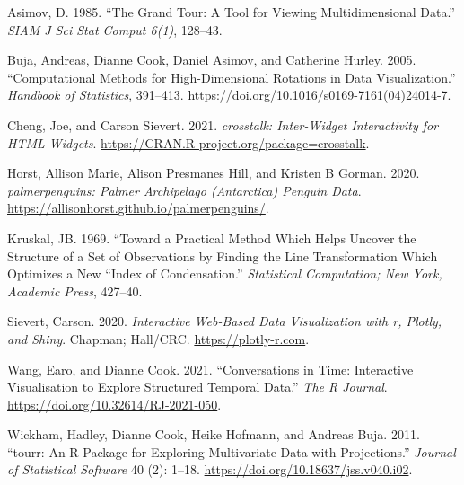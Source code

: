 \hypertarget{refs}{}
\begin{CSLReferences}{1}{0}
\leavevmode{}%
Asimov, D. 1985. {``The Grand Tour: A Tool for Viewing Multidimensional Data.''} \emph{SIAM J Sci Stat Comput 6(1)}, 128--43.

\leavevmode{}%
Buja, Andreas, Dianne Cook, Daniel Asimov, and Catherine Hurley. 2005. {``Computational Methods for High-Dimensional Rotations in Data Visualization.''} \emph{Handbook of Statistics}, 391--413. \url{https://doi.org/10.1016/s0169-7161(04)24014-7}.

\leavevmode{}%
Cheng, Joe, and Carson Sievert. 2021. \emph{{crosstalk}: Inter-Widget Interactivity for HTML Widgets}. \url{https://CRAN.R-project.org/package=crosstalk}.

\leavevmode{}%
Horst, Allison Marie, Alison Presmanes Hill, and Kristen B Gorman. 2020. \emph{{palmerpenguins}: Palmer Archipelago (Antarctica) Penguin Data}. \url{https://allisonhorst.github.io/palmerpenguins/}.

\leavevmode{}%
Kruskal, JB. 1969. {``Toward a Practical Method Which Helps Uncover the Structure of a Set of Observations by Finding the Line Transformation Which Optimizes a New ``Index of Condensation.''} \emph{Statistical Computation; New York, Academic Press}, 427--40.

\leavevmode{}%
Sievert, Carson. 2020. \emph{{Interactive Web-Based Data Visualizatio}n with r, Plotly, and Shiny}. Chapman; Hall/CRC. \url{https://plotly-r.com}.

\leavevmode{}%
Wang, Earo, and Dianne Cook. 2021. {``Conversations in Time: Interactive Visualisation to Explore Structured Temporal Data.''} \emph{The R Journal}. \url{https://doi.org/10.32614/RJ-2021-050}.

\leavevmode{}%
Wickham, Hadley, Dianne Cook, Heike Hofmann, and Andreas Buja. 2011. {``{tourr}: An {R} Package for Exploring Multivariate Data with Projections.''} \emph{Journal of Statistical Software} 40 (2): 1--18. \url{https://doi.org/10.18637/jss.v040.i02}.

\end{CSLReferences}



